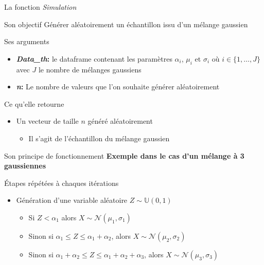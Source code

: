 \documentclass[11pt]{beamer}
\begin{document}
	\begin{frame}{La fonction \textit{Simulation}}
		\begin{block}{Son objectif}
			\small
			Générer aléatoirement un échantillon issu 
			d'un mélange gaussien
		\end{block}
		\begin{block}{Ses arguments}
			\begin{itemize}
				\small
				\item \textbf{\textit{Data\_th}:} le dataframe contenant les paramètres $\alpha_i$, $\mu_i$ et $\sigma_i$ où $i \in \{1, \dots ,J\}$ avec $J$ le nombre de mélanges gaussiens\\
				\item \textbf{\textit{n}:} Le nombre de valeurs que l'on souhaite générer aléatoirement
			\end{itemize}
		\end{block}
		\begin{block}{Ce qu'elle retourne}
			\begin{itemize}
				\small
				\item Un vecteur de taille $n$ généré aléatoirement
				\begin{itemize}
					\item Il s'agit de l'échantillon du mélange gaussien
				\end{itemize}
			\end{itemize}
		\end{block}
	\end{frame}
	\begin{frame}{Son principe de fonctionnement}
		\textbf{Exemple dans le cas d'un mélange à 3 gaussiennes}
		\begin{block}{Étapes répétées à chaques itérations}
			\begin{itemize}
				\item Génération d'une variable aléatoire $Z \sim \mathbb{U}(0,1)$
				\begin{itemize}
					\item Si $Z < \alpha_1$ alors $X \sim \mathcal{N}(\mu_1, \sigma_1)$ \\
					\item Sinon si $\alpha_1 \leq Z \leq \alpha_1 + \alpha_2$, alors $X \sim \mathcal{N}(\mu_2, \sigma_2)$ \\
					\item Sinon si  $\alpha_1 + \alpha_2 \leq Z \leq \alpha_1 + \alpha_2 + \alpha_3$, alors $X \sim \mathcal{N}(\mu_3, \sigma_3)$
				\end{itemize}
			\end{itemize}
		\end{block}
	\end{frame}
	
\end{document}
